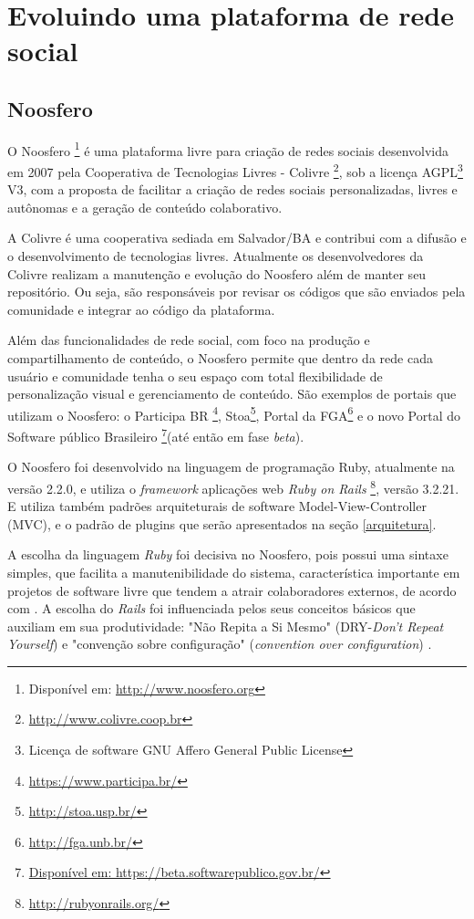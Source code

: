 \chapter{Evoluindo uma plataforma de rede social}
\label{evol-rede-social}
%
\section{Noosfero}
\label{noosfero}

O Noosfero \footnote{Disponível em: \url{http://www.noosfero.org}} é uma plataforma livre para criação de redes sociais desenvolvida em 2007 pela Cooperativa de Tecnologias Livres - Colivre \footnote{\url{http://www.colivre.coop.br}}, sob a licença AGPL\footnote{Licença de software GNU Affero General Public License} V3, com a proposta de facilitar a criação de redes sociais personalizadas, livres e autônomas e a geração de conteúdo colaborativo.

A Colivre é uma cooperativa sediada em Salvador/BA e contribui com a difusão e o desenvolvimento de tecnologias livres. Atualmente os desenvolvedores da Colivre realizam a manutenção e evolução do Noosfero além de manter seu repositório. Ou seja, são responsáveis por revisar os códigos que são enviados pela comunidade e integrar ao código da plataforma.

Além das funcionalidades de rede social, com foco na produção e compartilhamento de conteúdo, o Noosfero permite que dentro da rede cada usuário e comunidade tenha o seu espaço com total flexibilidade de personalização visual e gerenciamento de conteúdo. São exemplos de portais que utilizam o Noosfero: o Participa BR \footnote{\url{https://www.participa.br/}}, Stoa\footnote{\url{http://stoa.usp.br/}}, Portal da FGA\footnote{\url{http://fga.unb.br/}} e o novo Portal do Software público Brasileiro \footnote{\url{Disponível em: https://beta.softwarepublico.gov.br/}}(até então em fase \textit{beta}).

O Noosfero foi desenvolvido na linguagem de programação Ruby, atualmente na versão 2.2.0, e utiliza o \textit{framework} aplicações web \textit{Ruby on Rails} \footnote{\url{http://rubyonrails.org/}}, versão 3.2.21. E utiliza também padrões arquiteturais de software Model-View-Controller (MVC), e o padrão de plugins que serão apresentados na seção \ref{arquitetura}.

A escolha da linguagem \textit{Ruby} foi decisiva no Noosfero, pois possui uma sintaxe simples, que facilita a manutenibilidade do sistema, característica importante em projetos de software livre que tendem a atrair colaboradores externos, de acordo com . A escolha do \textit{Rails} foi influenciada pelos seus conceitos básicos que auxiliam em sua produtividade: "Não Repita a Si Mesmo" (DRY-\textit{Don't Repeat Yourself}) e "convenção sobre configuração" (\textit{convention over configuration}) \cite{akita2006repensando}.

